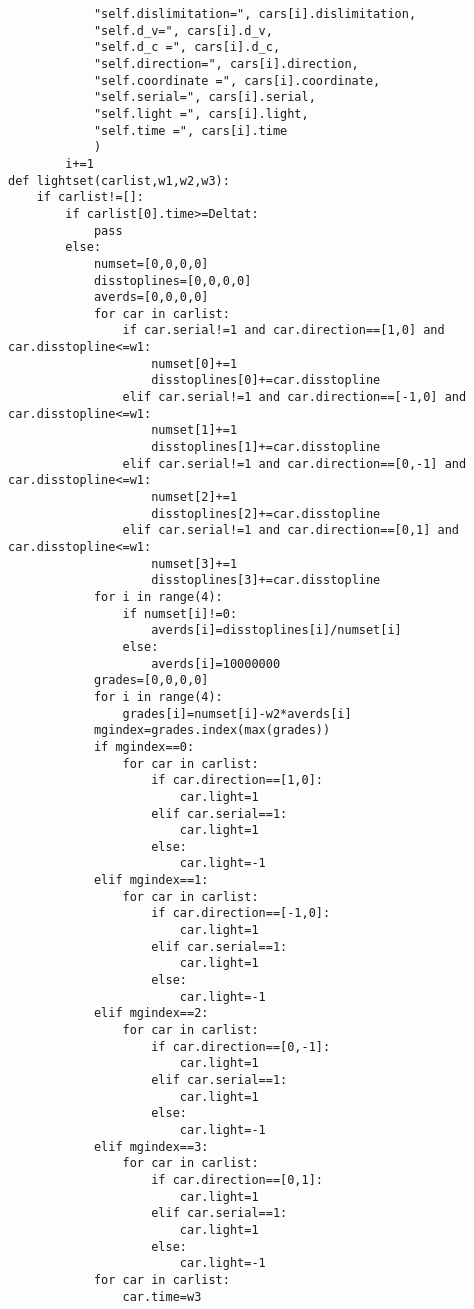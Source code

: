 \documentclass[a4paper,12pt]{article}
\numberwithin{equation}{section}
\begin{document}
\begin{appendix}
\begin{lstlisting}
            "self.dislimitation=", cars[i].dislimitation,
            "self.d_v=", cars[i].d_v,
            "self.d_c =", cars[i].d_c,
            "self.direction=", cars[i].direction,
            "self.coordinate =", cars[i].coordinate,
            "self.serial=", cars[i].serial,
            "self.light =", cars[i].light,
            "self.time =", cars[i].time
            )
        i+=1
def lightset(carlist,w1,w2,w3):
    if carlist!=[]:
        if carlist[0].time>=Deltat:
            pass
        else:
            numset=[0,0,0,0]
            disstoplines=[0,0,0,0]
            averds=[0,0,0,0]
            for car in carlist:
                if car.serial!=1 and car.direction==[1,0] and car.disstopline<=w1:
                    numset[0]+=1
                    disstoplines[0]+=car.disstopline
                elif car.serial!=1 and car.direction==[-1,0] and car.disstopline<=w1:
                    numset[1]+=1
                    disstoplines[1]+=car.disstopline
                elif car.serial!=1 and car.direction==[0,-1] and car.disstopline<=w1:
                    numset[2]+=1
                    disstoplines[2]+=car.disstopline
                elif car.serial!=1 and car.direction==[0,1] and car.disstopline<=w1:
                    numset[3]+=1
                    disstoplines[3]+=car.disstopline
            for i in range(4):
                if numset[i]!=0:
                    averds[i]=disstoplines[i]/numset[i]
                else:
                    averds[i]=10000000
            grades=[0,0,0,0]
            for i in range(4):
                grades[i]=numset[i]-w2*averds[i]
            mgindex=grades.index(max(grades))
            if mgindex==0:
                for car in carlist:
                    if car.direction==[1,0]:
                        car.light=1
                    elif car.serial==1:
                        car.light=1
                    else:
                        car.light=-1
            elif mgindex==1:
                for car in carlist:
                    if car.direction==[-1,0]:
                        car.light=1
                    elif car.serial==1:
                        car.light=1
                    else:
                        car.light=-1
            elif mgindex==2:
                for car in carlist:
                    if car.direction==[0,-1]:
                        car.light=1
                    elif car.serial==1:
                        car.light=1
                    else:
                        car.light=-1
            elif mgindex==3:
                for car in carlist:
                    if car.direction==[0,1]:
                        car.light=1
                    elif car.serial==1:
                        car.light=1
                    else:
                        car.light=-1
            for car in carlist:
                car.time=w3
	\end{lstlisting}

\end{appendix}
\end{document}
